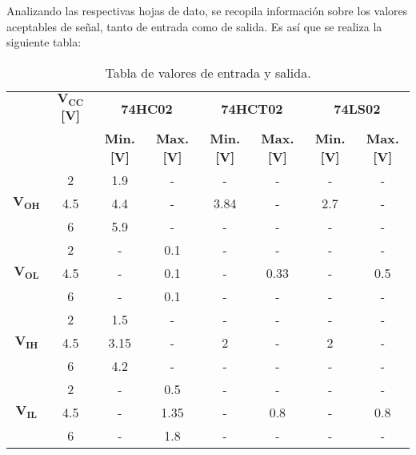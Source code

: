 Analizando las respectivas hojas de dato, se recopila información sobre los  valores aceptables de señal, tanto de entrada como de salida. Es así que se realiza la siguiente tabla:
\begin{table}[H]
\centering
\begin{tabular}{c|c|c|c|c|c|c|c|}
\cline{2-8}
                               & $\mathbf{V_{CC}}$ \textbf{[V]} & \multicolumn{2}{c|}{\textbf{74HC02}}  & \multicolumn{2}{c|}{\textbf{74HCT02}} & \multicolumn{2}{c|}{\textbf{74LS02}} \\ \cline{3-8} 
                               &              & \textbf{Min. [V]} & \textbf{Max. [V]} & \textbf{Min. [V]} & \textbf{Max. [V]} & \textbf{Min. [V]} & \textbf{Max. [V]}	\\ \hline
\multicolumn{1}{|c|}{}         & 2            & 1.9           & -            & -             & -            & -          & -            \\  
\multicolumn{1}{|c|}{$\mathbf{V_{OH}}$} & 4.5          & 4.4           & -            & 3.84          & -            & 2.7            & -            \\  
\multicolumn{1}{|c|}{}         & 6            & 5.9           & -            & -             & -            & -            & -            \\ \hline
\multicolumn{1}{|c|}{}         & 2            & -             & 0.1          & -             & -            & -            & -          \\
\multicolumn{1}{|c|}{$\mathbf{V_{OL}}$} & 4.5          & -             & 0.1          & -             & 0.33         & -            & 0.5            \\
\multicolumn{1}{|c|}{}         & 6            & -             & 0.1          & -             & -            & -            & -            \\ \hline
\multicolumn{1}{|c|}{}         & 2            & 1.5           & -            & -             & -            & -            & -            \\ 
\multicolumn{1}{|c|}{$\mathbf{V_{IH}}$}  & 4.5          & 3.15          & -            & 2             & -            & 2            & -            \\ 
\multicolumn{1}{|c|}{}         & 6            & 4.2           & -            & -             & -            & -            & -            \\ \hline
\multicolumn{1}{|c|}{}         & 2            & -             & 0.5          & -             & -            & -            & -            \\ 
\multicolumn{1}{|c|}{$\mathbf{V_{IL}}$} & 4.5          & -             & 1.35         & -             & 0.8          & -            & 0.8          \\ 
\multicolumn{1}{|c|}{}         & 6            & -             & 1.8          & -             & -            & -            & -            \\ \hline
\end{tabular}
\centering
\caption{Tabla de valores de entrada y salida.}
\label{tabla:vinout}
\end{table}

